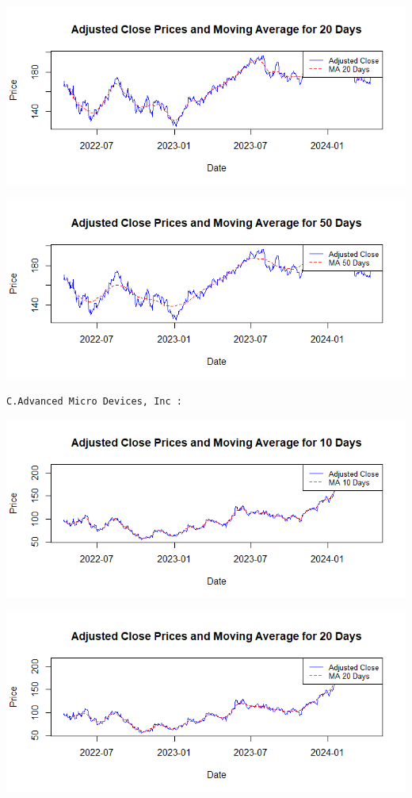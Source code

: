 \documentclass[
  letterpaper,
  DIV=11,
  numbers=noendperiod]{scrartcl}
\begin{document}
\includegraphics{images/MovingAverage20daysApple.png}

\includegraphics{images/MovingAverage50daysApple.png}

\texttt{C.Advanced\ Micro\ Devices,\ Inc\ :}

\includegraphics{images/MovingAverage10daysMD.png}

\includegraphics{images/MovingAverage20daysMD.png}
\end{document}
